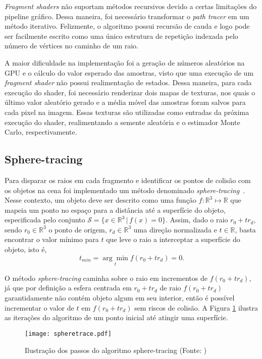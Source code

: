\documentclass[11pt,a4paper]{article}
\begin{document}
\textit{Fragment shaders} não suportam métodos recursivos devido a certas limitações do pipeline gráfico. Dessa maneira, foi necessário transformar o \textit{path tracer} em um método iterativo. Felizmente, o algoritmo possui recursão de cauda e logo pode ser facilmente escrito como uma único estrutura de repetição indexada pelo número de vértices no caminho de um raio. 

A maior dificuldade na implementação foi a geração de números aleatórios na GPU e o cálculo do valor esperado das amostras, visto que uma execução de um \textit{fragment shader} não possui realimentação de estados. Dessa maneira, para cada execução do shader, foi necessário renderizar dois mapas de texturas, nos quais o último valor aleatório gerado e a média móvel das amostras foram salvos para cada pixel na imagem. Essas texturas são utilizadas como entradas da próxima execução do shader, realimentando a semente aleatória e o estimador Monte Carlo, respectivamente.

\subsection{Sphere-tracing}
Para disparar os raios em cada fragmento e identificar os pontos de colisão com os objetos na cena foi implementado um método denominado \textit{sphere-tracing}~\cite{Hart:94}. Nesse contexto, um objeto deve ser descrito como uma função $f:\mathbb{R}^3\mapsto\mathbb{R}$ que mapeia um ponto no espaço para a distância até a superfície do objeto, especificada pelo conjunto $\mathcal{S} = \{x \in \mathbb{R}^3 \,|\, f(x) = 0\}$. Assim, dado o raio $r_0 + tr_d$, sendo $r_0 \in \mathbb{R}^3$ o ponto de origem, $r_d \in \mathbb{R}^3$ uma direção normalizada e $t \in \mathbb{R}$, basta encontrar o valor mínimo para $t$ que leve o raio a interceptar a superfície do objeto, isto é, $$t_{min} = \underset{t}{\arg\min} f(r_0 + tr_d) = 0.$$

O método \textit{sphere-tracing} caminha sobre o raio em incrementos de $f(r_0 + tr_d)$, já que por definição a esfera centrada em $r_0 + tr_d$ de raio $f(r_0 + tr_d)$ garantidamente não contém objeto algum em seu interior, então é possível incrementar o valor de $t$ em $f(r_0 + tr_d)$ sem riscos de colisão. A Figura \ref{fig:spheretrace} ilustra as iterações do algoritmo de um ponto inicial até atingir uma superfície.

\begin{figure}[!htpb]
  \centering
  \texttt{[image: spheretrace.pdf]}
  \caption{Ilustração dos passos do algoritmo sphere-tracing (Fonte: \cite{Keinert:14})}
  \label{fig:spheretrace}
\end{figure}
\end{document}
